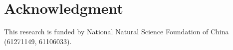 \documentclass[conference]{IEEEtran}
\begin{document}
%





\section*{Acknowledgment}

This research is funded by National Natural Science Foundation of China (61271149, 61106033).



%
%
%
\end{document}
